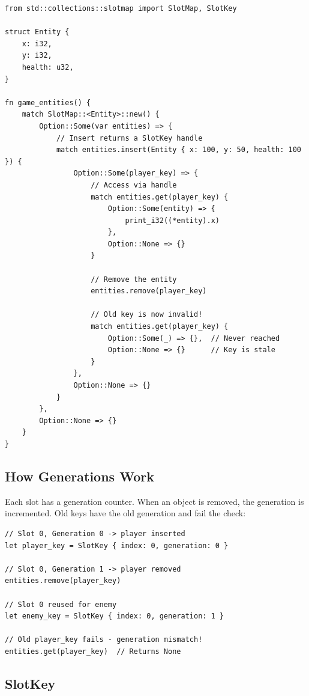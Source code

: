 \begin{lstlisting}
from std::collections::slotmap import SlotMap, SlotKey

struct Entity {
    x: i32,
    y: i32,
    health: u32,
}

fn game_entities() {
    match SlotMap::<Entity>::new() {
        Option::Some(var entities) => {
            // Insert returns a SlotKey handle
            match entities.insert(Entity { x: 100, y: 50, health: 100 }) {
                Option::Some(player_key) => {
                    // Access via handle
                    match entities.get(player_key) {
                        Option::Some(entity) => {
                            print_i32((*entity).x)
                        },
                        Option::None => {}
                    }

                    // Remove the entity
                    entities.remove(player_key)

                    // Old key is now invalid!
                    match entities.get(player_key) {
                        Option::Some(_) => {},  // Never reached
                        Option::None => {}      // Key is stale
                    }
                },
                Option::None => {}
            }
        },
        Option::None => {}
    }
}
\end{lstlisting}

\subsection{How Generations Work}

Each slot has a generation counter. When an object is removed, the generation is incremented. Old keys have the old generation and fail the check:

\begin{lstlisting}
// Slot 0, Generation 0 -> player inserted
let player_key = SlotKey { index: 0, generation: 0 }

// Slot 0, Generation 1 -> player removed
entities.remove(player_key)

// Slot 0 reused for enemy
let enemy_key = SlotKey { index: 0, generation: 1 }

// Old player_key fails - generation mismatch!
entities.get(player_key)  // Returns None
\end{lstlisting}

\subsection{SlotKey}

